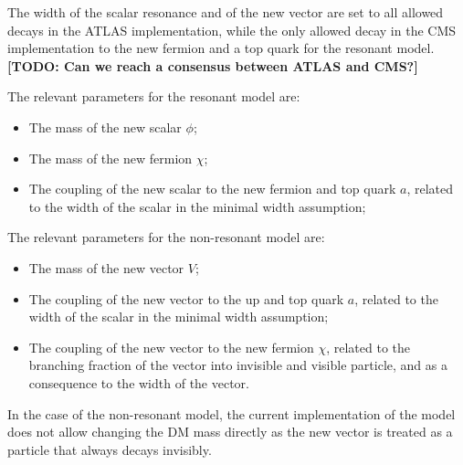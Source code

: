 The width of the scalar resonance and of the new vector are set to all allowed decays in the ATLAS implementation,
while the only allowed decay in the CMS implementation to the new fermion and a top quark for the resonant model. 
\textbf{[TODO: Can we reach a consensus between ATLAS and CMS?]}




The relevant parameters for the resonant model are:
\begin{itemize}
	\item The mass of the new scalar $\phi$;
	\item The mass of the new fermion $\chi$;
	\item The coupling of the new scalar to the new fermion and top quark $a$, 
	related to the width of the scalar in the minimal width assumption;
\end{itemize}	

The relevant parameters for the non-resonant model are:
\begin{itemize}
	\item The mass of the new vector $V$;
	\item The coupling of the new vector to the up and top quark $a$, 
	related to the width of the scalar in the minimal width assumption;
	\item The coupling of the new vector to the new fermion $\chi$, 
	related to the branching fraction of the vector into invisible and visible particle,
	and as a consequence to the width of the vector. 
\end{itemize}	

In the case of the non-resonant model, the current implementation
of the model does not allow changing the DM mass directly as the
new vector is treated as a particle that always decays invisibly. 


